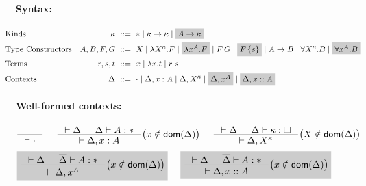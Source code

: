 \begin{figure}
\begin{framed}
\paragraph{Syntax:}
\begin{align*}
\!\!\!\!\!\!\!\!&\text{Kinds}
 	& \kappa		&~ ::= ~ *
				\mid \kappa -> \kappa
				\mid \newFi{A -> \kappa}
\\
\!\!\!\!\!\!\!\!&\text{Type Constructors}
	& A,B,F,G		&~ ::= ~ X
				\mid \lambda X^\kappa.F
				\mid \newFi{\lambda x^A.F}
				\mid F\,G
				\mid \newFi{F\,\{s\}}
				\mid A -> B
				\mid \forall X^\kappa . B
				\mid \newFi{\forall x^A . B}
\\
\!\!\!\!\!\!\!\!&\text{Terms}
	& r,s,t			&~ ::= ~ x \mid \lambda x.t \mid r\;s
\\
\!\!\!\!\!\!\!\!&\text{Contexts}
	& \Delta		&~ ::= ~ \cdot
				\mid \Delta, x : A
				\mid \Delta, X^\kappa
				\mid \newFi{\Delta, x^A}
				\mid \newFi{\Delta, x::A}
\end{align*}

\paragraph{Well-formed contexts:}
\[ \inference{}{|- \cdot}
 ~~~~
   \inference{|- \Delta & \Delta |- A:*}
             {|- \Delta,x:A}
      \big( x\notin\dom(\Delta) \big)
 ~~~~
   \inference{|- \Delta & \Delta |- \kappa:\square}
             {|- \Delta,X^\kappa}
      \big( X\notin\dom(\Delta) \big)
\]
\[ \newFi{
   \inference{|- \Delta & \overline\Delta |- A:*}
             {|- \Delta,x^A}
      \big( x\notin\dom(\Delta) \big) }
 ~~~~
 \newFi{
   \inference{|- \Delta & \overline\Delta |- A:*}
             {|- \Delta,x::A}
      \big( x\notin\dom(\Delta) \big) }
\]


\end{framed}
\end{figure}
